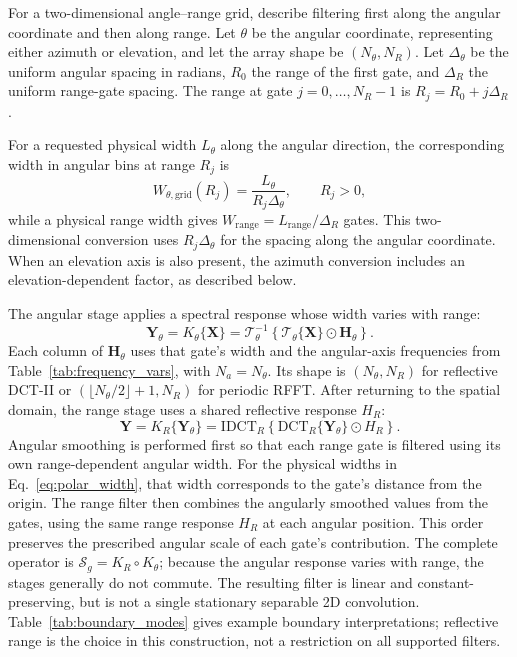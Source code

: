 \documentclass[a4paper,fleqn]{cas-sc}
\newcommand{\mat}[1]{\mathbf{#1}}       %
\begin{document}
For a two-dimensional angle--range grid, \citet[Sect.~2.3, Eqs.~(12)--(17)]{Valdivia2026RadarDCT} describe filtering first along the angular coordinate and then along range. Let $\theta$ be the angular coordinate, representing either azimuth or elevation, and let the array shape be $(N_\theta,N_R)$. Let $\Delta_\theta$ be the uniform angular spacing in radians, $R_0$ the range of the first gate, and $\Delta_R$ the uniform range-gate spacing. The range at gate $j=0,\ldots,N_R-1$ is $R_j=R_0+j\Delta_R$.

For a requested physical width $L_\theta$ along the angular direction, the corresponding width in angular bins at range $R_j$ is
\begin{equation}
	W_{\theta,\mathrm{grid}}(R_j)=\frac{L_\theta}{R_j\Delta_\theta}, \qquad R_j>0,
	\label{eq:polar_width}
\end{equation}
while a physical range width gives $W_{\mathrm{range}}=L_{\mathrm{range}}/\Delta_R$ gates. This two-dimensional conversion uses $R_j\Delta_\theta$ for the spacing along the angular coordinate. When an elevation axis is also present, the azimuth conversion includes an elevation-dependent factor, as described below.

The angular stage applies a spectral response whose width varies with range:
\begin{equation}
	\mat{Y}_{\theta} = K_\theta\{\mat{X}\}=\mathcal{T}_{\theta}^{-1}\!\left\{\mathcal{T}_{\theta}\{\mat{X}\}\odot \mat{H}_{\theta}\right\}.
	\label{eq:polar_stage1}
\end{equation}
Each column of $\mat{H}_\theta$ uses that gate's width and the angular-axis frequencies from Table~\ref{tab:frequency_vars}, with $N_a=N_\theta$. Its shape is $(N_\theta,N_R)$ for reflective DCT-II or $(\lfloor N_\theta/2\rfloor+1,N_R)$ for periodic RFFT. After returning to the spatial domain, the range stage uses a shared reflective response $H_R$:
\begin{equation}
	\mat{Y} = K_R\{\mat{Y}_{\theta}\}=\mathrm{IDCT}_R\!\left\{\mathrm{DCT}_R\{\mat{Y}_{\theta}\}\odot H_R\right\}.
	\label{eq:polar_stage2}
\end{equation}
Angular smoothing is performed first so that each range gate is filtered using its own range-dependent angular width. For the physical widths in Eq.~\ref{eq:polar_width}, that width corresponds to the gate's distance from the origin. The range filter then combines the angularly smoothed values from the gates, using the same range response $H_R$ at each angular position. This order preserves the prescribed angular scale of each gate's contribution. The complete operator is $\mathcal{S}_g=K_R\circ K_\theta$; because the angular response varies with range, the stages generally do not commute. The resulting filter is linear and constant-preserving, but is not a single stationary separable 2D convolution. Table~\ref{tab:boundary_modes} gives example boundary interpretations; reflective range is the choice in this construction, not a restriction on all supported filters.
\end{document}
